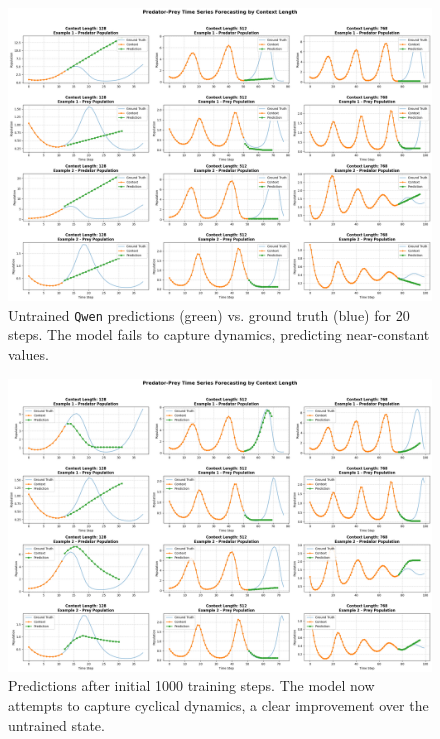 \documentclass{article}
\begin{document}
\begin{figure}[!htbp]
    \centering
    \includegraphics[width=0.9\linewidth]{M2 Course Work//Images/untrained_performance.png}
    \caption{Untrained \texttt{Qwen} predictions (green) vs. ground truth (blue) for 20 steps. The model fails to capture dynamics, predicting near-constant values.} %
    \label{fig:untrained_predictions}
\end{figure}

\begin{figure}[!htbp]
    \centering
    \includegraphics[width=0.9\linewidth]{M2 Course Work//Images/intial_training_result.png}
    \caption{Predictions after initial 1000 training steps. The model now attempts to capture cyclical dynamics, a clear improvement over the untrained state.} %
    \label{fig:initial_training_predictions}
\end{figure}
\end{document}
